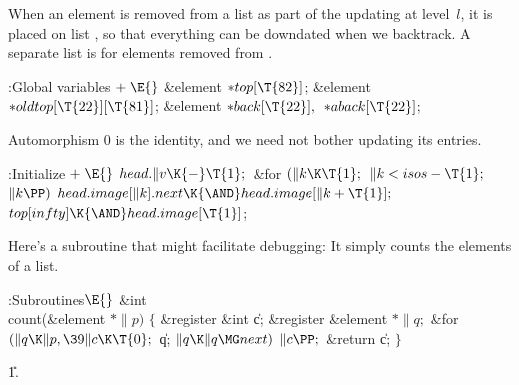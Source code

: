 When an element is removed from a list as part of the updating at level~$l$,
it is placed on list , so that everything can be downdated
when we backtrack. A separate list  is for elements removed
from .

\Y\B\4:Global variables\X${}\mathrel+\E{}$\6
\&{element} ${}{*}\\{top}[\T{82}]{}$;\6
\&{element} ${}{*}\\{oldtop}[\T{22}][\T{81}]{}$;\6
\&{element} ${}{*}\\{back}[\T{22}],{}$ ${}{*}\\{aback}[\T{22}]{}$;\par
\fi

Automorphism 0 is the identity, and we need not bother
updating its entries.

\Y\B\4:Initialize\X${}\mathrel+\E{}$\6
$\\{head}.\|v\K{-}\T{1};{}$\6
\&{for} ${}(\|k\K\T{1};{}$ ${}\|k<\\{isos}-\T{1};{}$ ${}\|k\PP){}$\1\5
${}\\{head}.\\{image}[\|k].\\{next}\K{\AND}\\{head}.\\{image}[\|k+\T{1}];{}$\2\6
${}\\{top}[\\{infty}]\K{\AND}\\{head}.\\{image}[\T{1}]{}$;\par
\fi

Here's a subroutine that might facilitate debugging: It
simply
counts the elements of a list.

\Y\B\4:Subroutines\X${}\E{}$\6
\&{int} \\{count}(\&{element} ${}{*}\|p){}$\1\1\2\2\6
${}\{{}$\1\6
\&{register} \&{int} \|c;\6
\&{register} \&{element} ${}{*}\|q;{}$\7
\&{for} ${}(\|q\K\|p,\39\|c\K\T{0};{}$ \|q; ${}\|q\K\|q\MG\\{next}){}$\1\5
${}\|c\PP;{}$\2\6
\&{return} \|c;\6
\4${}\}{}$\2\par
\U1.\fi

